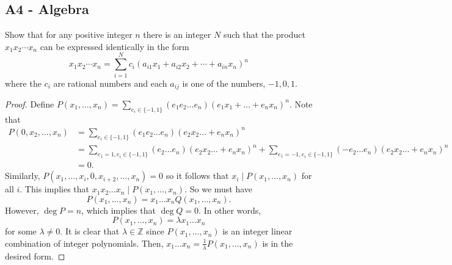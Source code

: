 \documentclass[11pt]{scrartcl}
\newcommand{\Z}{\mathbb{Z}}
\newcommand{\<}{\langle}
\renewcommand{\>}{\rangle}
\begin{document}
\subsection{A4 - Algebra}
Show that for any positive integer $n$ there is an integer $N$ such that the product $x_1x_2\cdots x_n$ can be expressed identically in the form
\[x_1x_2\cdots x_n=\sum_{i=1}^Nc_i(a_{i1}x_1+a_{i2}x_2+\cdots +a_{in}x_n)^n\]
where the $c_i$ are rational numbers and each $a_{ij}$ is one of the numbers, $-1,0,1.$
\begin{proof}
Define $P(x_1, \dots, x_n) = \sum_{e_i \in \{-1, 1\}} (e_1 e_2 \dots e_n) (e_1x_1 + \dots + e_nx_n)^n$.  Note that 
\begin{align*}
P(0, x_2, \dots, x_n) &= \sum_{e_i \in \{-1, 1\}} (e_1 e_2 \dots e_n) (e_2x_2 \dots + e_nx_n)^n \\
&= \sum_{e_1 = 1, e_i \in \{-1, 1\}} (e_2 \dots e_n) (e_2x_2 \dots + e_nx_n)^n +  \sum_{e_1 = -1, e_i \in \{-1, 1\}} (-e_2 \dots e_n) (e_2x_2 \dots + e_nx_n)^n \\
&= 0.
\end{align*}
Similarly, $P(x_1, \dots, x_i, 0, x_{i+2}, \dots, x_n) = 0$ so it follows that $x_i \mid P(x_1, \dots, x_n)$ for all $i$.  This implies that $x_1x_2\dots x_n \mid P(x_1, \dots, x_n)$.  So we must have 
$$P(x_1, \dots, x_n) = x_1\dots x_n Q(x_1, \dots, x_n).$$
However, $\deg P = n$, which implies that $\deg Q = 0$.  In other words,
$$P(x_1, \dots, x_n) = \lambda x_1 \dots x_n$$
for some $\lambda \ne 0$.  It is clear that $\lambda \in \Z$ since $P(x_1, \dots, x_n)$ is an integer linear combination of integer polynomials.  Then, $x_1 \dots x_n = \frac{1}{\lambda}P(x_1, \dots, x_n)$ is in the desired form.  
\end{proof}
\end{document}
